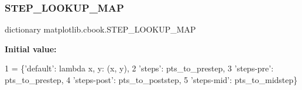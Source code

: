 \mbox{\label{namespacematplotlib_1_1cbook_ae4d385490090a4c9ed6f059cb2dedb5d}} 
\subsubsection{\texorpdfstring{S\+T\+E\+P\+\_\+\+L\+O\+O\+K\+U\+P\+\_\+\+M\+AP}{STEP\_LOOKUP\_MAP}}
{\footnotesize\ttfamily dictionary matplotlib.\+cbook.\+S\+T\+E\+P\+\_\+\+L\+O\+O\+K\+U\+P\+\_\+\+M\+AP}

{\bfseries Initial value\+:}
\begin{DoxyCode}
1 =  \{\textcolor{stringliteral}{'default'}: \textcolor{keyword}{lambda} x, y: (x, y),
2                    \textcolor{stringliteral}{'steps'}: pts\_to\_prestep,
3                    \textcolor{stringliteral}{'steps-pre'}: pts\_to\_prestep,
4                    \textcolor{stringliteral}{'steps-post'}: pts\_to\_poststep,
5                    \textcolor{stringliteral}{'steps-mid'}: pts\_to\_midstep\}
\end{DoxyCode}
